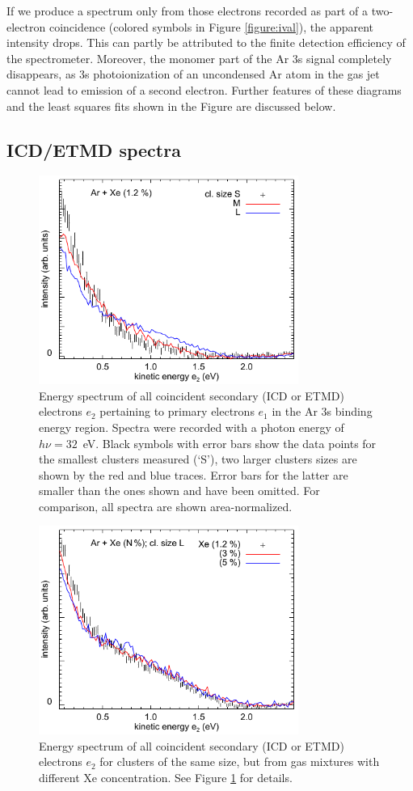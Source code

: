 If we produce a spectrum only from those electrons recorded as part of a two-electron coincidence (colored symbols in Figure \ref{figure:ival}), the apparent intensity drops.
This can partly be attributed to the finite detection efficiency of the spectrometer. 
Moreover, the monomer part of the Ar 3s signal completely disappears, as 3s photoionization of an uncondensed Ar atom in the gas jet cannot lead to emission of a second electron. 
Further features of these diagrams and the least squares fits shown in the Figure are discussed below.
%
%
\subsection{ICD/ETMD spectra}
%
\begin{figure}[ht]
 \centering
 \includegraphics[width=8.5cm]{pics/figure_icd_12.pdf}
 \caption{
Energy spectrum of all coincident secondary (ICD or ETMD) electrons $e_2$ pertaining to primary electrons $e_1$ in the Ar 3s binding energy region. 
Spectra were recorded with a photon energy of $h\nu = 32$~eV. 
Black symbols with error bars show the data points for the smallest clusters measured (`S'), two larger clusters sizes are shown by the red and blue traces. 
Error bars for the latter are smaller than the ones shown and have been omitted.
For comparison, all spectra are shown area-normalized. 
}
 \label{figure:icd_12}
\end{figure}
%
%
\begin{figure}[ht]
 \centering
 \includegraphics[width=8.5cm]{pics/figure_icd_l.pdf}
 \caption{
Energy spectrum of all coincident secondary (ICD or ETMD) electrons $e_2$ for clusters of the same size, but from gas mixtures with different Xe concentration. See Figure \protect\ref{figure:icd_12} for details.
}
 \label{figure:icd_l}
\end{figure}
